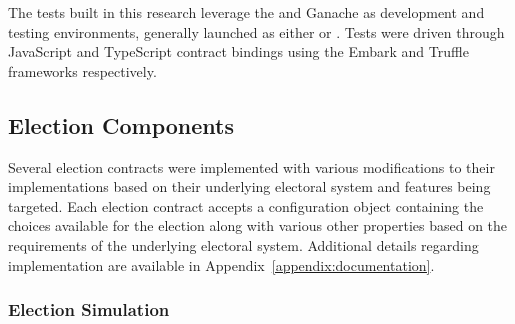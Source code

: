 %
%

The tests built in this research leverage the  and Ganache as
development and testing environments, generally launched as either
 or . Tests were driven through JavaScript and TypeScript
contract bindings using the Embark and Truffle frameworks respectively.

\subsection{Election Components}
Several election contracts were implemented with various modifications to their
implementations based on their underlying electoral system and features being
targeted. Each election contract accepts a configuration object containing the
choices available for the election along with various other properties based on
the requirements of the underlying electoral system. Additional details
regarding implementation are available in Appendix~\ref{appendix:documentation}.


\subsubsection{Election Simulation}

